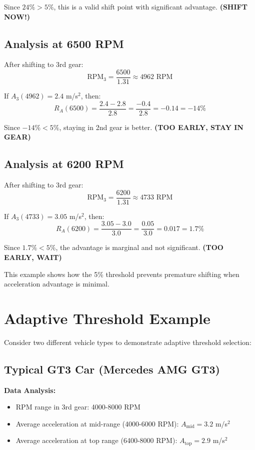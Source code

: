 \documentclass[12pt]{article}
\begin{document}
Since $24\% > 5\%$, this is a valid shift point with significant advantage. \textbf{(SHIFT NOW!)}

\subsection{Analysis at 6500 RPM}
After shifting to 3rd gear:
\begin{equation}
\text{RPM}_3 = \frac{6500}{1.31} \approx 4962 \text{ RPM}
\end{equation}

If $A_3(4962) = 2.4$ m/s$^2$, then:
\begin{equation}
R_A(6500) = \frac{2.4 - 2.8}{2.8} = \frac{-0.4}{2.8} = -0.14 = -14\%
\end{equation}

Since $-14\% < 5\%$, staying in 2nd gear is better. \textbf{(TOO EARLY, STAY IN GEAR)}

\subsection{Analysis at 6200 RPM}
After shifting to 3rd gear:
\begin{equation}
\text{RPM}_3 = \frac{6200}{1.31} \approx 4733 \text{ RPM}
\end{equation}

If $A_3(4733) = 3.05$ m/s$^2$, then:
\begin{equation}
R_A(6200) = \frac{3.05 - 3.0}{3.0} = \frac{0.05}{3.0} = 0.017 = 1.7\%
\end{equation}

Since $1.7\% < 5\%$, the advantage is marginal and not significant. \textbf{(TOO EARLY, WAIT)}

This example shows how the 5\% threshold prevents premature shifting when acceleration advantage is minimal.

\section{Adaptive Threshold Example}

Consider two different vehicle types to demonstrate adaptive threshold selection:

\subsection{Typical GT3 Car (Mercedes AMG GT3)}

\textbf{Data Analysis:}
\begin{itemize}
    \item RPM range in 3rd gear: 4000-8000 RPM
    \item Average acceleration at mid-range (4000-6000 RPM): $A_{\text{mid}} = 3.2$ m/s$^2$
    \item Average acceleration at top range (6400-8000 RPM): $A_{\text{top}} = 2.9$ m/s$^2$
\end{itemize}
\end{document}
